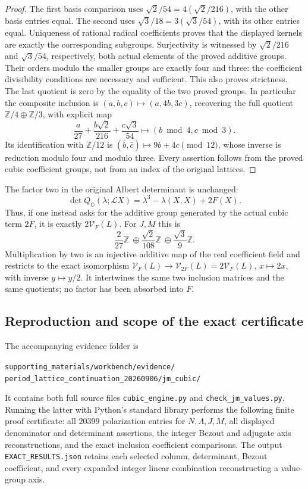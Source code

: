 \begin{proof}
The first basis comparison uses
\(\sqrt2/54=4(\sqrt2/216)\), with the other basis entries equal.
The second uses \(\sqrt3/18=3(\sqrt3/54)\), with its other
entries equal. Uniqueness of rational radical coefficients proves
that the displayed kernels are exactly the corresponding subgroups.
Surjectivity is witnessed by \(\sqrt2/216\) and \(\sqrt3/54\),
respectively, both actual elements of the proved additive groups.
Their orders modulo the smaller groups are exactly four and three:
the coefficient divisibility conditions are necessary and sufficient.
This also proves strictness. The last quotient is zero by the equality
of the two proved groups. In particular the composite inclusion is
\((a,b,c)\mapsto(a,4b,3c)\), recovering the full quotient
\(\mathbb Z/4\oplus\mathbb Z/3\), with explicit map
\[
 \frac a{27}+\frac{b\sqrt2}{216}+\frac{c\sqrt3}{54}
       \longmapsto (b\bmod4,c\bmod3).
\]
Its identification with \(\mathbb Z/12\) is
\((\bar b,\bar c)\mapsto9b+4c\pmod{12}\), whose inverse is
reduction modulo four and modulo three. Every assertion follows
from the proved cubic coefficient groups, not from an index of
the original lattices.
\end{proof}

The factor two in the original Albert determinant is unchanged:
\[
 \det Q_{\mathbb O}(\lambda;\mathcal LX)
       =\lambda^3-\lambda(X,X)+2F(X).
\]
Thus, if one instead asks for the additive group generated by the
actual cubic term \(2F\), it is exactly \(2\mathcal V_F(L)\).
For \(J,M\) this is
\[
 \frac2{27}\mathbb Z\ \oplus\frac{\sqrt2}{108}\mathbb Z
                           \ \oplus\frac{\sqrt3}{9}\mathbb Z.
\]
Multiplication by two is an injective additive map of the real
coefficient field and restricts to the exact isomorphism
$\mathcal V_F(L)\to\mathcal V_{2F}(L)=2\mathcal V_F(L)$,
$x\mapsto2x$, with inverse $y\mapsto y/2$.
It intertwines the same two inclusion matrices and
the same quotients; no factor has been absorbed into \(F\).

\subsection{Reproduction and scope of the exact certificate}

The accompanying evidence folder is
\begin{flushleft}\small
\texttt{supporting\_materials/workbench/evidence/}\\
\texttt{period\_lattice\_continuation\_20260906/jm\_cubic/}
\end{flushleft}
It contains both full source files \texttt{cubic\_engine.py} and
\texttt{check\_jm\_values.py}. Running the latter with Python's
standard library performs the following finite proof certificate:
all \(20399\) polarization entries for \(N,\Lambda,J,M\), all
displayed denominator and determinant assertions, the integer
Bezout and adjugate axis reconstructions, and the exact inclusion
coefficient comparisons. The output \texttt{EXACT\_RESULTS.json}
retains each selected column, determinant, Bezout coefficient,
and every expanded integer linear combination reconstructing a
value-group axis.

